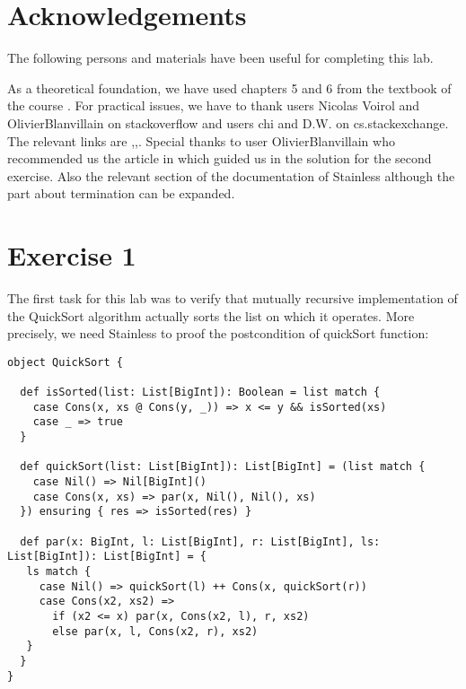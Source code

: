 \documentclass{article}
\begin{document}
\makeatletter\renewcommand{\ALG@name}{Algoritmo}

\maketitle



\newpage

\section{Acknowledgements}

The following persons and materials have been useful for completing this lab. 

As a theoretical foundation, we have used chapters 5 and 6 from the textbook of the course \cite{calculus-of-computation}. For practical issues, we have to thank users Nicolas Voirol and OlivierBlanvillain on stackoverflow and users chi and D.W. on cs.stackexchange. The relevant links are \cite{concatenation},\cite{forall},\cite{typeannotations}. Special thanks to user OlivierBlanvillain who recommended us the article in \cite{typearticle} which guided us in the solution for the second exercise. Also the relevant section of the documentation of Stainless \cite{termination} although the part about termination can be expanded. 

\section{Exercise 1}

The first task for this lab was to verify that mutually recursive implementation of the QuickSort algorithm actually sorts the list on which it operates. More precisely, we need Stainless to proof the postcondition of quickSort function:


\begin{lstlisting}[label={list:first},caption=Original implementation to verify]
object QuickSort {
 
  def isSorted(list: List[BigInt]): Boolean = list match {
    case Cons(x, xs @ Cons(y, _)) => x <= y && isSorted(xs)
    case _ => true
  }
 
  def quickSort(list: List[BigInt]): List[BigInt] = (list match {
    case Nil() => Nil[BigInt]()
    case Cons(x, xs) => par(x, Nil(), Nil(), xs)
  }) ensuring { res => isSorted(res) }
 
  def par(x: BigInt, l: List[BigInt], r: List[BigInt], ls: List[BigInt]): List[BigInt] = {
   ls match {
     case Nil() => quickSort(l) ++ Cons(x, quickSort(r))
     case Cons(x2, xs2) => 
       if (x2 <= x) par(x, Cons(x2, l), r, xs2) 
       else par(x, l, Cons(x2, r), xs2)
   }
  }
}
\end{lstlisting}
\end{document}
